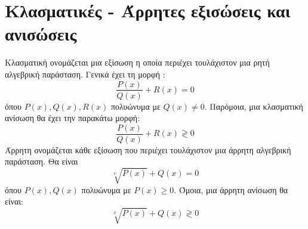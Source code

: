 \section{Κλασματικές - Άρρητες εξισώσεις και ανισώσεις}
\orismoi
{}
Κλασματική ονομάζεται μια εξίσωση η οποία περιέχει τουλάχιστον μια ρητή αλγεβρική παράσταση. Γενικά έχει τη μορφή :
\[ \dfrac{P(x)}{Q(x)}+R(x)= 0\]
όπου $ P(x),Q(x),R(x) $ πολυώνυμα με $ Q(x)\neq0 $. Παρόμοια, μια κλασματική ανίσωση θα έχει την παρακάτω μορφή:\\
\[ \dfrac{P(x)}{Q(x)}+R(x)\gtrless0\]
Άρρητη ονομάζεται κάθε εξίσωση που περιέχει τουλάχιστον μια άρρητη αλγεβρική παράσταση. Θα είναι
\[ \sqrt[\nu]{P(x)}+Q(x)=0 \]
όπου $ P(x),Q(x) $ πολυώνυμα με $ P(x)\geq0 $. Όμοια, μια άρρητη ανίσωση θα είναι:
\[ \sqrt[\nu]{P(x)}+Q(x)\gtrless0 \]
